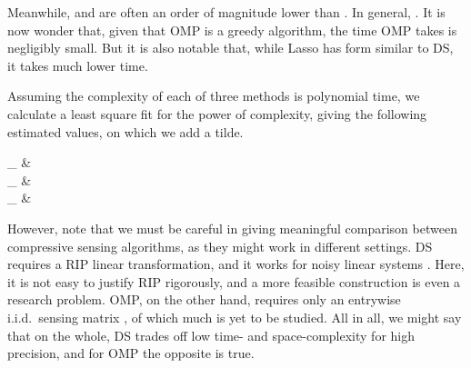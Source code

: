 Meanwhile,  and  are often an order of magnitude lower than .
In general, .
It is now wonder that, given that OMP is a greedy algorithm, the time OMP takes is negligibly small.
But it is also notable that, while Lasso has form similar to DS, it takes much lower time.

Assuming the complexity of each of three methods is polynomial time, we calculate a least square fit for the power of complexity, giving the following estimated values, on which we add a tilde.

 {
_{} \eqsim &  \\
_{} \eqsim &  \\
_{} \eqsim &  
}

However, note that we must be careful in giving meaningful comparison between compressive sensing algorithms, as they might work in different settings.
DS requires a RIP linear transformation, and it works for noisy linear systems \cite {CaT07}.
Here, it is not easy to justify RIP rigorously, and a more feasible construction is even a research problem.
OMP, on the other hand, requires only an entrywise i.i.d.\ sensing matrix \cite {TrG07a}, of which much is yet to be studied.
All in all, we might say that on the whole, DS trades off low time- and space-complexity for high precision, and for OMP the opposite is true.

